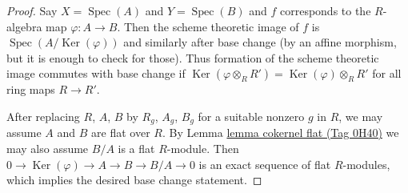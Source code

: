 \documentclass{amsart}
\theoremstyle{plain}
\theoremstyle{definition}
\theoremstyle{remark}
\numberwithin{equation}{subsection}
\def\Spec{\mathop{\mathrm{Spec}}}
\def\Ker{\mathop{\mathrm{Ker}}}
\begin{document}
\begin{proof}
\medskip\noindent
Say $X = \Spec(A)$ and $Y = \Spec(B)$ and $f$ corresponds
to the $R$-algebra map $\varphi : A \to B$.
Then the scheme theoretic image of $f$ is $\Spec(A/\Ker(\varphi))$
and similarly after base change (by an affine morphism, but it is
enough to check for those).
Thus formation of the scheme theoretic image commutes
with base change if $\Ker(\varphi \otimes_R R') = \Ker(\varphi) \otimes_R R'$
for all ring maps $R \to R'$.

\medskip\noindent
After replacing $R$, $A$, $B$ by $R_g$, $A_g$, $B_g$ for a suitable
nonzero $g$ in $R$, we may assume $A$ and $B$ are flat over $R$.
By Lemma \href{https://stacks.math.columbia.edu/tag/0H40}{lemma cokernel flat (Tag 0H40)}
we may also assume $B/A$ is a flat $R$-module.
Then $0 \to \Ker(\varphi) \to A \to B \to B/A \to 0$
is an exact sequence of flat $R$-modules, which implies
the desired base change statement.
\end{proof}
\end{document}
